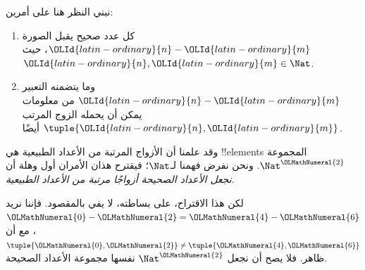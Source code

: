 \documentclass[../../../include/open-logic-section]{subfiles}
\begin{document}

نبني النظر هنا على أمرين:
\begin{enumerate}
\item كل عدد صحيح يقبل الصورة $\OLId{latin-ordinary}{n} - \OLId{latin-ordinary}{m}$، حيث $\OLId{latin-ordinary}{n}, \OLId{latin-ordinary}{m} \in\Nat$.
\item وما يتضمنه التعبير $\OLId{latin-ordinary}{n} - \OLId{latin-ordinary}{m}$ من معلومات يمكن أن يحمله الزوج المرتب $\tuple{\OLId{latin-ordinary}{n}, \OLId{latin-ordinary}{m}}$ أيضًا.
\end{enumerate}
وقد علمنا أن الأزواج المرتبة من الأعداد الطبيعية هي !!{element}s المجموعة $\Nat^\OLMathNumeral{2}$. ونحن نفرض فهمنا لـ$\Nat$؛ فيقترح هذان الأمران أول وهلة أن \emph{نجعل الأعداد الصحيحة أزواجًا مرتبة من الأعداد الطبيعية}.

لكن هذا الاقتراح، على بساطته، لا يفي بالمقصود. فإننا نريد $\OLMathNumeral{0}- \OLMathNumeral{2} = \OLMathNumeral{4} - \OLMathNumeral{6}$، مع أن $\tuple{\OLMathNumeral{0}, \OLMathNumeral{2} }\neq \tuple{\OLMathNumeral{4}, \OLMathNumeral{6}}$ ظاهر. فلا يصح أن نجعل $\Nat^\OLMathNumeral{2}$ نفسها مجموعة الأعداد الصحيحة.
\end{document}

